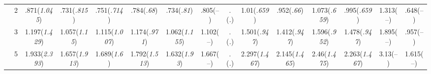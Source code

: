 \documentclass{article}
\begin{document}
\begin{table}[tbp]
{\begin{tabularx}{\textwidth}{lCCCCCCCCCCCCCC}
&2&.871\newline (\emph{1.045})&.731\newline (\emph{.815})&.751\newline (\emph{.714})&.784\newline (\emph{.68})&.734\newline (\emph{.81})&.805\newline (--)&.\newline (\emph{.})&1.01\newline (\emph{.659})&.952\newline (\emph{.66})&1.073\newline (\emph{.659})&.995\newline (\emph{.659})&1.313\newline (--)&.648\newline (--) \tabularnewline
&3&1.197\newline (\emph{1.429})&1.057\newline (\emph{1.15})&1.115\newline (\emph{1.007})&1.174\newline (\emph{.971})&1.062\newline (\emph{1.155})&1.102\newline (--)&.\newline (\emph{.})&1.501\newline (\emph{.947})&1.412\newline (\emph{.947})&1.596\newline (\emph{.952})&1.478\newline (\emph{.947})&1.895\newline (--)&.957\newline (--) \tabularnewline
&5&1.933\newline (\emph{2.393})&1.657\newline (\emph{1.913})&1.689\newline (\emph{1.6})&1.792\newline (\emph{1.513})&1.632\newline (\emph{1.93})&1.667\newline (--)&.\newline (\emph{.})&2.297\newline (\emph{1.467})&2.145\newline (\emph{1.465})&2.46\newline (\emph{1.475})&2.263\newline (\emph{1.467})&3.13\newline (--)&1.615\newline (--) \tabularnewline

\end{tabularx}}
\end{table}
\end{document}
